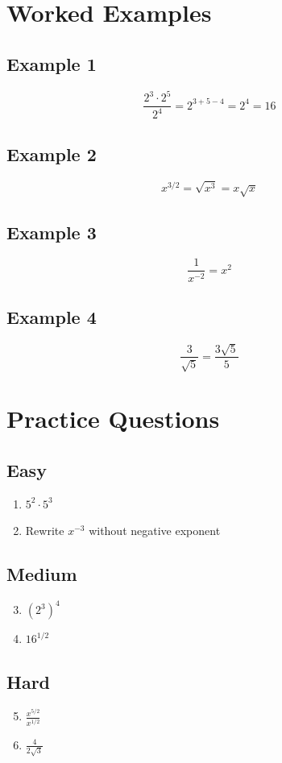 \section*{Worked Examples}

\subsection*{Example 1}
\[
\frac{2^3 \cdot 2^5}{2^4} = 2^{3+5-4} = 2^4 = 16
\]

\subsection*{Example 2}
\[
x^{3/2} = \sqrt{x^3} = x\sqrt{x}
\]

\subsection*{Example 3}
\[
\frac{1}{x^{-2}} = x^2
\]

\subsection*{Example 4}
\[
\frac{3}{\sqrt{5}} = \frac{3\sqrt{5}}{5}
\]

\section*{Practice Questions}

\subsection*{Easy}
\begin{enumerate}
    \item $5^2 \cdot 5^3$
    \item Rewrite $x^{-3}$ without negative exponent
\end{enumerate}

\subsection*{Medium}
\begin{enumerate}
    \setcounter{enumi}{2}
    \item $(2^3)^4$
    \item $16^{1/2}$
\end{enumerate}

\subsection*{Hard}
\begin{enumerate}
    \setcounter{enumi}{4}
    \item $\frac{x^{5/2}}{x^{1/2}}$
    \item $\frac{4}{2\sqrt{3}}$
\end{enumerate}

